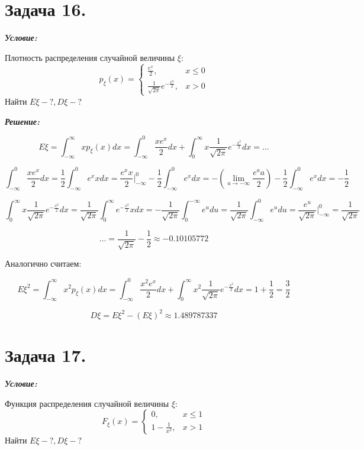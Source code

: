 \section*{Задача 16.}

\noindent\textit{\textbf{Условие:}}

Плотность распределения случайной величины $\xi$:
\[
p_{\xi} (x) =
\begin{cases}
\frac{e^x}{2}, &x \le 0 \\
\frac{1}{\sqrt{2 \pi}} e^{-\frac{x^2}{2}}, &x > 0
\end{cases}
\]
Найти $E\xi - ?, D\xi - ?$

\noindent\textit{\textbf{Решение:}}

\[
E\xi = \int_{-\infty}^{\infty} x p_{\xi}(x) dx = \int_{-\infty}^0 \frac{xe^x}{2}dx + \int_{0}^{\infty} x \frac{1}{\sqrt{2 \pi}}e^{-\frac{x^2}{2}} dx = \dots
\]

\[
\int_{-\infty}^0 \frac{xe^x}{2}dx = \frac{1}{2} \int_{-\infty}^0 e^x x dx = \frac{e^x x}{2} \bigg|_{-\infty}^{0} - \frac{1}{2} \int_{-\infty}^0 e^x dx = - \left( \lim_{a \to - \infty} \frac{e^aa}{2} \right) - \frac{1}{2} \int_{-\infty}^0 e^x dx = - \frac{1}{2}
\]

\[
\int_{0}^{\infty} x \frac{1}{\sqrt{2 \pi}}e^{-\frac{x^2}{2}} dx = \frac{1}{\sqrt{2 \pi}} \int_{0}^{\infty} e^{-\frac{x^2}{2}}x dx = - \frac{1}{\sqrt{2 \pi}} \int_{0}^{- \infty} e^{u} du = \frac{1}{\sqrt{2 \pi}} \int_{-\infty}^0 e^u du = \frac{e^u}{\sqrt{2 \pi}} \bigg|_{-\infty}^0 = \frac{1}{\sqrt{2 \pi}}
\]

\[
\dots = \frac{1}{\sqrt{2 \pi}} - \frac{1}{2} \approx -0.10105772
\]

Аналогично считаем:

\[
E\xi^2 = \int_{-\infty}^{\infty} x^2 p_{\xi}(x) dx = \int_{-\infty}^0 \frac{x^2e^x}{2}dx + \int_{0}^{\infty} x^2 \frac{1}{\sqrt{2 \pi}} e^{-\frac{x^2}{2}} dx = 1 + \frac{1}{2} = \frac{3}{2}
\]

\[
D\xi = E\xi^2 - (E\xi)^2 \approx 1.489787337
\]

\section*{Задача 17.}

\noindent\textit{\textbf{Условие:}}

Функция распределения случайной величины $\xi$:
\[
F_{\xi} (x) =
\begin{cases}
0, &x \le 1 \\
1 - \frac{1}{x^2}, &x > 1
\end{cases}
\]
Найти $E\xi - ?, D\xi - ?$

